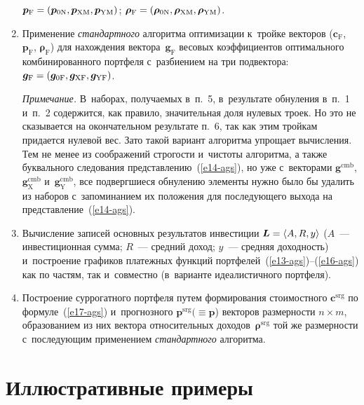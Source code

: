 \begin{multicols}{2}
\begin{enumerate}[1.]
$\boldsymbol{p}_{\mathrm{F}}\hm = (\boldsymbol{p}_{\mathrm{0N}}, 
\boldsymbol{p}_{\mathrm{XM}}, \boldsymbol{p}_{\mathrm{YM}})$; 
$\boldsymbol{\rho}_{\mathrm{F}}\hm = (\boldsymbol{\rho}_{\mathrm{0N}}, 
\boldsymbol{\rho}_{\mathrm{XM}}, \boldsymbol{\rho}_{\mathrm{YM}})$. 
  \item Применение \textit{стандартного} алгоритма оптимизации к~тройке 
векторов ($\boldsymbol{c}_{\mathrm{F}}$, $\boldsymbol{p}_{\mathrm{F}}$, 
$\boldsymbol{\rho}_{\mathrm{F}}$) для нахождения 
вектора~$\boldsymbol{g}_{\mathrm{F}}$ весовых коэффициентов 
оптимального комбинированного портфеля с~разбиением на три подвектора: 
$\boldsymbol{g}_{\mathrm{F}}\hm= (\boldsymbol{g}_{\mathrm{0F}}, 
\boldsymbol{g}_{\mathrm{XF}}, \boldsymbol{g}_{\mathrm{YF}})$. 
  
  {\small \textit{Примечание.} В~наборах, получаемых в~п.~5, в~результате обнуления в~п.~1 
и~п.~2 содержится, как правило, значительная доля нулевых троек. Но это не сказывается на 
окончательном результате п.~6, так как этим тройкам придается нулевой вес. Зато такой 
вариант алгоритма упрощает вычисления. Тем не менее из соображений строгости и~чистоты 
алгоритма, а также буквального следования представлению~(\ref{e14-ags}), но уже 
с~векторами $\boldsymbol{g}^{\mathrm{cmb}}$, 
$\boldsymbol{g}^{\mathrm{cmb}}_{\mathrm{X}}$ 
и~$\boldsymbol{g}_{\mathrm{Y}}^{\mathrm{cmb}}$, все подвергшиеся обнулению элементы нужно 
было бы удалить из наборов с~запоминанием их положения для последующего выхода на 
представление~(\ref{e14-ags}).}
  
  
  \item  Вычисление записей основных результатов инвестиции 
$\boldsymbol{L}\hm= \langle A, R, y\rangle$ ($A$~--- инвестиционная сумма; 
$R$~--- средний доход; $y$~--- средняя доходность) и~построение графиков 
платежных функций 
 портфелей~(\ref{e13-ags})--(\ref{e16-ags}) как по частям, так и~совместно 
(в~варианте идеалистичного портфеля). 
  \item Построение суррогатного портфеля путем формирования стоимостного 
$\boldsymbol{c}^{\mathrm{srg}}$ по формуле~(\ref{e17-ags}) и~прогнозного 
$\boldsymbol{p}^{\mathrm{srg}} (\equiv \boldsymbol{p}$) векторов размерности $n\times 
m$, образованием из них вектора относительных 
доходов~$\boldsymbol{\rho}^{\mathrm{srg}}$ той же размерности с~последующим 
применением \textit{стандартного} алгоритма. 
  \end{enumerate}
  
  \section{Иллюстративные примеры}
  

\end{multicols}
